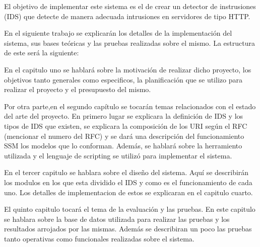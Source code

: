 El objetivo de implementar este sistema es el de crear un detector de instrusiones (IDS) que detecte de manera adecuada intrusiones en servidores de tipo HTTP.

En el siguiente trabajo se explicar\'an los detalles de la implementaci\'on del sistema, sus bases te\'oricas y las pruebas realizadas sobre el mismo. La estructura de este ser\'a la siguiente:

En el capitulo uno se hablar\'a sobre la motivación de realizar dicho proyecto, los objetivos tanto generales como especificos, la planificaci\'on que se utilizo para realizar el proyecto y el presupuesto del mismo.

Por otra parte,en el segundo cap\'itulo se tocar\'an temas relacionados con el estado del arte del proyecto.  En primero lugar se explicara la definici\'on de IDS y los tipos de IDS que existen, se explicara la composici\'on de los URI seg\'un el RFC (mencionar el numero del RFC) y se dar\'a una descripci\'on del funcionamiento SSM los modelos que lo conforman. Adem\'as, se hablar\'a sobre la herramiento utilizada y el lenguaje de scripting se utiliz\'o para implementar el sistema.

En el tercer capitulo se hablara sobre el diseño del sistema. Aqu\'i se describir\'an los modulos en los que esta dividido el IDS y como es el funcionamiento de cada uno. Los detalles de implementacion de estos se explicaran en el capitulo cuarto.

El quinto capitulo tocar\'a el tema de la evaluaci\'on y las pruebas. En este capitulo se hablara sobre la base de datos utilizada para realizar las pruebas y los resultados arrojados por las mismas. Adem\'as se describiran un poco las pruebas tanto operativas como funcionales realizadas sobre el sistema.









